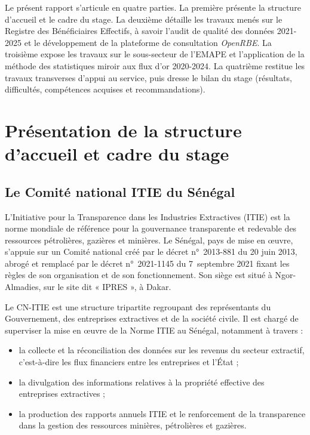 \documentclass[12pt, a4paper]{article}
\begin{document}
Le présent rapport s'articule en quatre parties. La première présente la
structure d'accueil et le cadre du stage. La deuxième détaille les travaux
menés sur le Registre des Bénéficiaires Effectifs, à savoir l'audit de qualité
des données 2021-2025 et le développement de la plateforme de consultation
\emph{OpenRBE}. La troisième expose les travaux sur le sous-secteur de l'EMAPE
et l'application de la méthode des statistiques miroir aux flux d'or
2020-2024. La quatrième restitue les travaux transverses d'appui au service,
puis dresse le bilan du stage (résultats, difficultés, compétences acquises et
recommandations).

\section{Présentation de la structure d'accueil et cadre du stage}

\subsection{Le Comité national ITIE du Sénégal}

L'Initiative pour la Transparence dans les Industries Extractives (ITIE) est la
norme mondiale de référence pour la gouvernance transparente et redevable des
ressources pétrolières, gazières et minières. Le Sénégal, pays de mise en
œuvre, s'appuie sur un Comité national créé par le décret
n°~2013-881 du 20 juin 2013, abrogé et remplacé par le décret n°~2021-1145 du
7~septembre 2021 fixant les règles de son organisation et de son
fonctionnement. Son siège est situé à Ngor-Almadies, sur le site dit « IPRES », à Dakar.

Le CN-ITIE est une structure tripartite regroupant des représentants du
Gouvernement, des entreprises extractives et de la société civile. Il est
chargé de superviser la mise en œuvre de la Norme ITIE au Sénégal, notamment à
travers :

\begin{itemize}
  \item la collecte et la réconciliation des données sur les revenus du secteur
  extractif, c'est-à-dire les flux financiers entre les entreprises et l'État ;
  \item la divulgation des informations relatives à la propriété effective des
  entreprises extractives ;
  \item la production des rapports annuels ITIE et le renforcement de la
  transparence dans la gestion des ressources minières, pétrolières et
  gazières.
\end{itemize}
\end{document}
